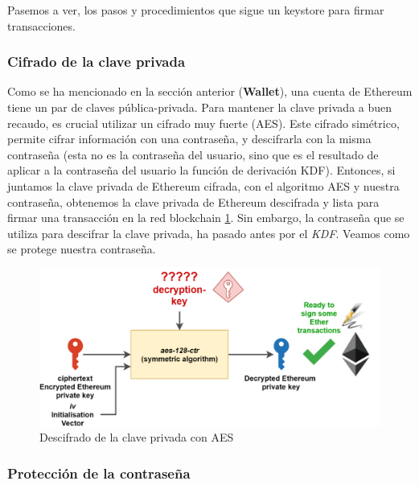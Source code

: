 Pasemos a ver, los pasos y procedimientos que sigue un keystore para firmar transacciones.

\subsubsection{Cifrado de la clave privada}

Como se ha mencionado en la sección anterior (\textbf{Wallet}), una cuenta de Ethereum tiene un par de claves pública-privada. Para mantener la clave privada a buen recaudo, es crucial utilizar un cifrado muy fuerte (AES). Este cifrado simétrico, permite cifrar información con una contraseña, y descifrarla con la misma contraseña (esta no es la contraseña del usuario, sino que es el resultado de aplicar a la contraseña del usuario la función de derivación KDF). Entonces, si juntamos la clave privada de Ethereum cifrada, con el algoritmo AES y nuestra contraseña, obtenemos la clave privada de Ethereum descifrada y lista para firmar una transacción en la red blockchain \ref{fig:keystore_aes}. Sin embargo, la contraseña que se utiliza para descifrar la clave privada, ha pasado antes por el \emph{KDF}. Veamos como se protege nuestra contraseña.

\begin{figure}[h!]
  \centering
  \includegraphics[width=0.8\linewidth]{figs/Desarrollo/Keystore/keystore_AES}
  \caption[Descifrado de la clave privada con AES]{Descifrado de la clave privada con AES}
  \label{fig:keystore_aes}
\end{figure}

\subsubsection{Protección de la contraseña}

